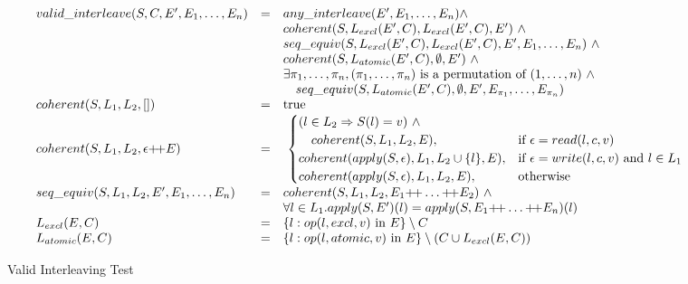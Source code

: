 \begin{figure*}
$$
\begin{array}{lll}
valid\_interleave(S, C, E', {E}_1,\ldots,{E}_n) & = & any\_interleave(E', {E}_1,\ldots,{E}_n) \wedge \\
& & coherent(S, L_{excl}(E', C), L_{excl}(E', C), E')\ \wedge \\
& & seq\_equiv(S, L_{excl}(E', C), L_{excl}(E', C), E', {E}_1,\ldots,{E}_n)\ \wedge \\
& & coherent(S, L_{atomic}(E', C), \emptyset, E')\ \wedge \\
& & \exists {\pi}_1,\ldots,{\pi}_n, ({\pi}_1,\ldots,{\pi}_n) \text{ is a permutation of } (1,\ldots,n)\ \wedge \\
& & \ \ \ seq\_equiv(S, L_{atomic}(E', C), \emptyset, E', E_{\pi_1}, \ldots, E_{\pi_n}) \\
coherent(S, L_1, L_2, []) & = & \text{true} \\
coherent(S, L_1, L_2, \epsilon \text{+\!+} E) & = &\
\begin{cases}
(l \in L_2 \Rightarrow S(l) = v)\ \wedge \\
\ \ \ coherent(S, L_1, L_2, E), & \text{if $\epsilon = read(l, c, v)$} \\
coherent(apply(S, \epsilon), L_1, L_2 \cup \{ l \}, E), & \text{if $\epsilon = write(l, c, v)$ and $l \in L_1$} \\
coherent(apply(S, \epsilon), L_1, L_2, E), & \text{otherwise}
\end{cases} \\
seq\_equiv(S, L_1, L_2, E', {E}_1,\ldots,{E}_n) & = & coherent(S, L_1, L_2, E_1 \text{+\!+} \ldots \text{+\!+} E_2)\ \wedge \\
& & \forall l \in L_1. apply(S, E')(l) = apply(S, E_1 \text{+\!+} \ldots \text{+\!+} E_n)(l) \\
L_{excl}(E, C) & = & \{ l : op(l, excl, v) \text{ in } E  \} \setminus C \\
L_{atomic}(E, C) & = & \{ l : op(l, atomic, v) \text{ in } E \} \setminus (C \cup L_{excl}(E, C)) \\
\end{array}
$$
\caption{Valid Interleaving Test}
\label{fig:validinterleave}
\end{figure*}

